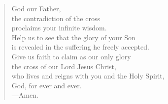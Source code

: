 \prayer

\setlength{\vleftmargin}{\prayerleftmargini}

\begin{verse}
God our Father,\\
the contradiction of the cross\\
proclaims your infinite wisdom.\\
Help us to see that the glory of your Son\\
is revealed in the suffering he freely accepted.\\
Give us faith to claim as our only glory\\
the cross of our Lord Jesus Christ,\\
who lives and reigns with you and the Holy Spirit,\\
God, for ever and ever.\\
{\color{red}---\thinspace}Amen.
\end{verse}

\setlength{\vleftmargin}{\defleftmargini}